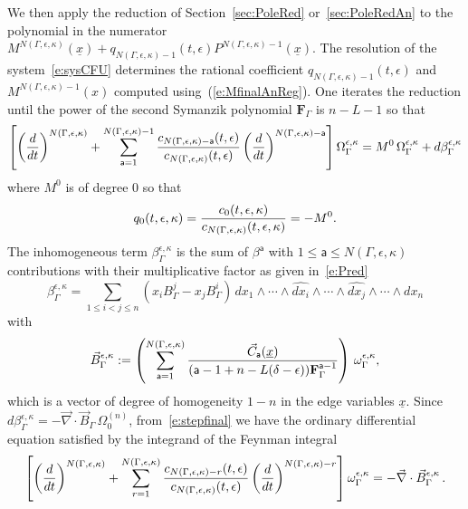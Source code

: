 \documentclass[a4paper,12pt]{article}
\numberwithin{equation}{section}
\numberwithin{figure}{section}
\begin{document}
We then apply the reduction of Section~\ref{sec:PoleRed} or~\ref{sec:PoleRedAn} to
the polynomial in the numerator
$M^{
      N(\Gamma,\epsilon,\kappa)}(\underline x)+q_{N(\Gamma,\epsilon,\kappa)-1}(t,\epsilon)
    P^{N(\Gamma,\epsilon,\kappa)-1}(\underline x)$.
The resolution of the
system~\eqref{e:sysCFU} determines the  rational coefficient
$q_{N(\Gamma,\epsilon,\kappa)-1}(t,\epsilon)$ and
$M^{N(\Gamma,\epsilon,\kappa)-1}(x)$ computed using~(\ref{e:MfinalAnReg}). One
iterates the reduction until the power of  the second Symanzik
polynomial $\textbf{F}_\Gamma$ is $n-L-1$ so
that
\begin{equation}\label{e:stepfinal}
\left[\left(d\over dt\right)^{N(\Gamma,\epsilon,\kappa)}
  +\sum_{\mathsf{a}=1}^{N(\Gamma,\epsilon,\kappa)-1}
  {c_{N(\Gamma,\epsilon,\kappa)-\mathsf{a}}(t,\epsilon)\over c_{N(\Gamma,\epsilon,\kappa)}(t,\epsilon)} \left(d\over dt\right)^{N(\Gamma,\epsilon,\kappa)-\mathsf{a}}\right] \Omega_\Gamma^{\epsilon,\kappa}=M^{0}\,\Omega_\Gamma^{\epsilon,\kappa}+ d\beta_\Gamma^{\epsilon ,\kappa}
\end{equation}
where $M^0$ is of degree 0 so that
\begin{equation}
  q_0(t,\epsilon,\kappa)=  {c_{0}(t,\epsilon,\kappa)\over
    c_{N(\Gamma,\epsilon,\kappa)}(t,\epsilon,\kappa)}= -M^0  .
\end{equation}
The inhomogeneous term  $\beta_\Gamma^{\epsilon,\kappa} $ is the sum of 
$\beta^{\mathsf{a}}$ with $1\leq
\mathsf{a}\leq N(\Gamma,\epsilon,\kappa)$
contributions with their multiplicative factor as given
in~\eqref{e:Pred}
\begin{equation}
  \label{e:betaGamma}
  \beta_\Gamma^{\epsilon,\kappa}= \sum_{1\leq i<j\leq n} (x_i B^j_\Gamma- x_j B^i_\Gamma) \,
  dx_1\wedge \cdots \wedge \widehat{dx_i}\wedge \cdots \wedge\widehat{dx_j}\wedge
  \cdots \wedge dx_n 
\end{equation}
with
\begin{equation}
  \label{e:BetaGamma}
  \vec B^{\epsilon,\kappa}_\Gamma:=\left(\sum_{\mathsf{a}=1}^{N(\Gamma,\epsilon,\kappa)} {
      \vec C_{\mathsf{a}} (\underline x) \over
   ( \mathsf{a}-1+n-L(\delta-\epsilon))\mathbf{F}_\Gamma^{\mathsf{a}-1}}\right) \,\omega_\Gamma^{\epsilon,\kappa} ,
\end{equation}
which is a vector of degree of homogeneity $1-n$ in the edge variables
$\underline x$.
Since $d\beta_\Gamma^{\epsilon,\kappa}= -\vec\nabla\cdot \vec B_\Gamma\,
\Omega_0^{(n)}$, from~\eqref{e:stepfinal} we have the ordinary
differential equation satisfied by the integrand of the Feynman
integral
\begin{equation}\label{e:stepfinalode}
\left[\left(d\over dt\right)^{N(\Gamma,\epsilon,\kappa)}
  +\sum_{r=1}^{N(\Gamma,\epsilon,\kappa)}
  {c_{N(\Gamma,\epsilon,\kappa)-r}(t,\epsilon)\over c_{N(\Gamma,\epsilon,\kappa)}(t,\epsilon)} \left(d\over dt\right)^{N(\Gamma,\epsilon,\kappa)-r}\right] \omega_\Gamma^{\epsilon,\kappa} =-\vec\nabla\cdot \vec B^{\epsilon,\kappa}_\Gamma\,.
\end{equation}
\end{document}
